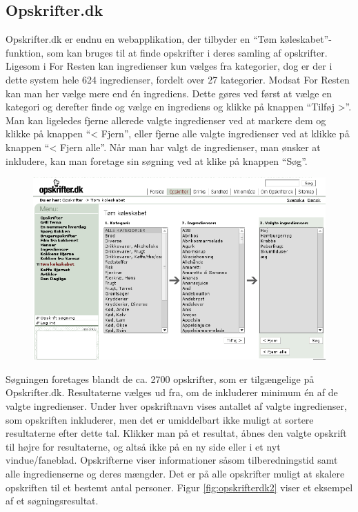 \subsection{Opskrifter.dk}
\label{subsec:opskrifterdk}

Opskrifter.dk er endnu en webapplikation, der tilbyder en ``Tøm køleskabet''-funktion, som kan bruges til at finde opskrifter i deres samling af opskrifter. Ligesom i For Resten kan ingredienser kun vælges fra kategorier, dog er der i dette system hele 624 ingredienser, fordelt over 27 kategorier. Modsat For Resten kan man her vælge mere end én ingrediens. Dette gøres ved først at vælge en kategori og derefter finde og vælge en ingrediens og klikke på knappen ``Tilføj >''. Man kan ligeledes fjerne allerede valgte ingredienser ved at markere dem og klikke på knappen ``< Fjern'', eller fjerne alle valgte ingredienser ved at klikke på knappen ``< Fjern alle''. Når man har valgt de ingredienser, man ønsker at inkludere, kan man foretage sin søgning ved at klike på knappen ``Søg''. 

\begin{figure}[H]
\centering
\includegraphics[scale=0.6]{billeder/forbilleder/opskrifterdk.png}
\label{fig:opskrifterdk1}
\end{figure}

Søgningen foretages blandt de ca. 2700 opskrifter, som er tilgængelige på Opskrifter.dk. Resultaterne vælges ud fra, om de inkluderer minimum én af de valgte ingredienser. Under hver opskriftnavn vises antallet af valgte ingredienser, som opskriften inkluderer, men det er umiddelbart ikke muligt at sortere resultaterne efter dette tal. Klikker man på et resultat, åbnes den valgte opskrift til højre for resultaterne, og altså ikke på en ny side eller i et nyt vindue/faneblad. Opskrifterne viser informationer såsom tilberedningstid samt alle ingredienserne og deres mængder. Det er på alle opskrifter muligt at skalere opskriften til et bestemt antal personer. Figur \ref{fig:opskrifterdk2} viser et eksempel af et søgningsresultat. 

